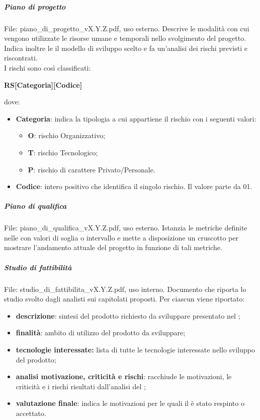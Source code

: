             \subparagraph{Piano di progetto}
            File: piano\_di\_progetto\_vX.Y.Z.pdf, uso esterno. Descrive le modalità con cui vengono utilizzate le risorse umane e temporali nello svolgimento del progetto. Indica inoltre le il modello di sviluppo scelto e fa un'analisi dei rischi previsti e riscontrati.\\
            I rischi sono così classificati:
            \begin{center}
                {\bfseries RS[Categoria][Codice]}
            \end{center}
            dove:
            \begin{itemize}
                \item \textbf{Categoria}: indica la tipologia a cui appartiene il rischio con i seguenti valori:
                \begin{itemize}
                    \item {\bfseries O}: rischio Organizzativo;
                    \item {\bfseries T}: rischio Tecnologico;
                    \item {\bfseries P}: rischio di carattere Privato/Personale. \\
                \end{itemize}
                \item \textbf{Codice}: intero positivo che identifica il singolo rischio. Il valore parte da 01.
            \end{itemize}

            \subparagraph{Piano di qualifica}
            File: piano\_di\_qualifica\_vX.Y.Z.pdf, uso esterno. Istanzia le metriche definite nelle  con valori di soglia o intervallo e mette a disposizione un cruscotto per mostrare l'andamento attuale del progetto in funzione di tali metriche.

            \subparagraph{Studio di fattibilità}
            File: studio\_di\_fattibilita\_vX.Y.Z.pdf, uso interno. Documento che riporta lo studio svolto dagli analisti sui capitolati proposti. Per ciascun  viene riportato:
            \begin{itemize}
                \item \textbf{descrizione}: sintesi del prodotto richiesto da sviluppare presentato nel ;
                \item \textbf{finalità}: ambito di utilizzo del prodotto da sviluppare;
                \item \textbf{tecnologie interessate:} lista di tutte le tecnologie interessate nello sviluppo del prodotto;
                \item \textbf{analisi motivazione, criticità e rischi}: racchiude le motivazioni, le criticità e i rischi risultati dall'analisi del ;
                \item \textbf{valutazione finale}: indica le motivazioni per le quali il  è stato respinto o accettato.
            \end{itemize}

